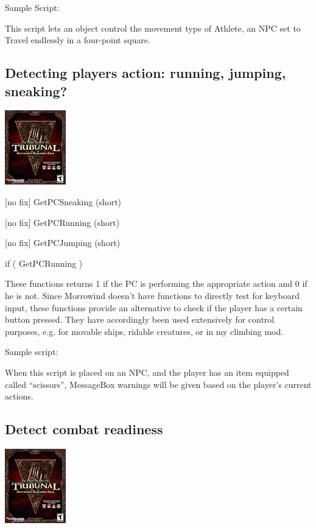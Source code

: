 \documentclass[
]{article}
\begin{document}
Sample Script:

This script lets an object control the movement type of Athlete, an NPC
set to Travel endlessly in a four-point square.



\hypertarget{detecting-players-action-running-jumping-sneaking}{%
\subsection{Detecting players action: running, jumping,
sneaking?}\label{detecting-players-action-running-jumping-sneaking}}

\includegraphics{media/image6.png}

{[}no fix{]} GetPCSneaking (short)

{[}no fix{]} GetPCRunning (short)

{[}no fix{]} GetPCJumping (short)

if ( GetPCRunning )

These functions returns 1 if the PC is performing the appropriate action
and 0 if he is not. Since Morrowind doesn't have functions to directly
test for keyboard input, these functions provide an alternative to check
if the player has a certain button pressed. They have accordingly been
used extensively for control purposes, e.g. for movable ships, ridable
creatures, or in my climbing mod.

Sample script:

When this script is placed on an NPC, and the player has an item
equipped called ``scissors'', MessageBox warnings will be given based on
the player's current actions.



\hypertarget{detect-combat-readiness}{%
\subsection{Detect combat readiness}\label{detect-combat-readiness}}

\includegraphics{media/image6.png}
\end{document}
